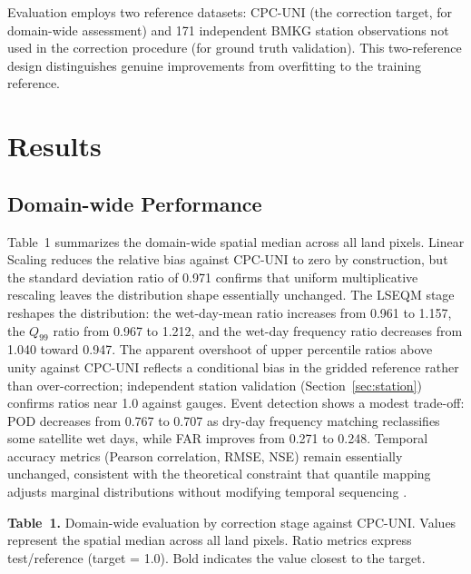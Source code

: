 \documentclass[11pt,a4paper]{article}
\begin{document}
Evaluation employs two reference datasets: CPC-UNI (the correction
target, for domain-wide assessment) and 171 independent BMKG station
observations not used in the correction procedure (for ground truth
validation). This two-reference design distinguishes genuine
improvements from overfitting to the training reference.

\section{Results}\label{results}

\subsection{Domain-wide Performance}\label{sec:domain}

Table~1 summarizes the domain-wide spatial median across
all land pixels. Linear Scaling reduces the relative bias against CPC-UNI
to zero by construction, but the standard deviation ratio of 0.971
confirms that uniform multiplicative rescaling leaves the distribution
shape essentially unchanged. The LSEQM stage reshapes the distribution:
the wet-day-mean ratio increases from 0.961 to 1.157, the $Q_{99}$ ratio
from 0.967 to 1.212, and the wet-day frequency ratio decreases from 1.040
toward 0.947. The apparent overshoot of upper percentile ratios above
unity against CPC-UNI reflects a conditional bias in the gridded
reference rather than over-correction; independent station validation
(Section~\ref{sec:station}) confirms ratios near 1.0 against gauges.
Event detection shows a modest trade-off: POD decreases from 0.767 to
0.707 as dry-day frequency matching reclassifies some satellite wet days,
while FAR improves from 0.271 to 0.248. Temporal accuracy metrics
(Pearson correlation, RMSE, NSE) remain essentially unchanged, consistent
with the theoretical constraint that quantile mapping adjusts marginal
distributions without modifying temporal sequencing \cite{ref34}.

\label{tab:domain}
\textbf{Table~1.} Domain-wide evaluation by correction stage against
CPC-UNI. Values represent the spatial median across all land pixels.
Ratio metrics express test/reference (target = 1.0). Bold indicates the
value closest to the target.
\end{document}
